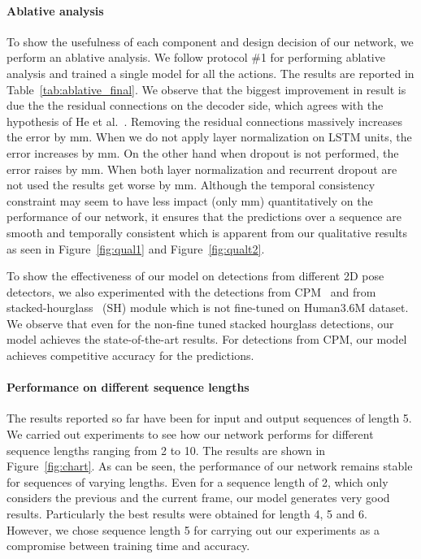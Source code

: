 \documentclass[runningheads]{llncs}
\begin{document}
\paragraph{Ablative analysis}
To show the usefulness of each component and design decision of our network, we perform an ablative analysis. We follow protocol \#1 for performing ablative analysis and trained a single model for all the actions. The results are reported in Table~\ref{tab:ablative_final}. We observe that the biggest improvement in result is due the the residual connections on the decoder side, which agrees with the hypothesis of He et al.~\cite{he2016deep}. Removing the residual connections massively increases the error by  mm. When we do not apply layer normalization on LSTM units, the error increases by  mm. On the other hand when dropout is not performed, the error raises by  mm. When both layer normalization and recurrent dropout are not used the results get worse by  mm. Although the temporal consistency constraint may seem to have less impact (only  mm) quantitatively on the performance of our network, it ensures that the predictions over a sequence are smooth and temporally consistent which is apparent from our qualitative results as seen in Figure~\ref{fig:qual1} and Figure~\ref{fig:qualt2}. 

To show the effectiveness of our model on detections from different 2D pose detectors, we also experimented with the detections from CPM~\cite{cpm} and from stacked-hourglass~\cite{stacked-hourglass} (SH) module which is not fine-tuned on Human3.6M dataset. We observe that even for the non-fine tuned stacked hourglass detections, our model achieves the state-of-the-art results. For detections from CPM, our model achieves competitive accuracy for the predictions.

\paragraph{Performance on different sequence lengths}
The results reported so far have been for input and output sequences of length 5. We carried out experiments to see how our network performs for different sequence lengths ranging from 2 to 10. The results are shown in Figure~\ref{fig:chart}. As can be seen, the performance of our network remains stable for sequences of varying lengths. Even for a sequence length of 2, which only considers the previous and the current frame, our model generates very good results. Particularly the best results were obtained for length 4, 5 and 6. However, we chose sequence length 5 for carrying out our experiments as a compromise between training time and accuracy. 
\end{document}
